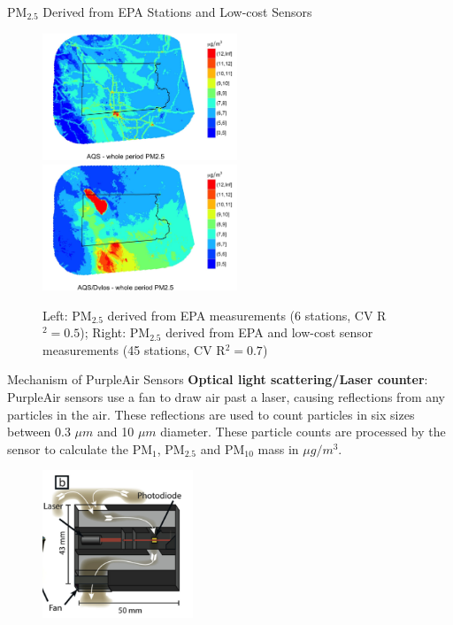 \documentclass[handout]{beamer} %
\begin{document}
\begin{frame}{PM$_{2.5}$ Derived from EPA Stations and Low-cost Sensors}
    \begin{figure}
        \centering
        \includegraphics[width=0.52\textwidth]{img/appendix/Aim2/aqs.jpg}
        \includegraphics[width=0.52\textwidth]{img/appendix/Aim2/aqs_dylos.jpg}
        \caption{Left: PM$_{2.5}$ derived from EPA measurements (6 stations, CV R$^2 = 0.5$); Right: PM$_{2.5}$ derived from EPA and low-cost sensor measurements (45 stations, CV R$^2 = 0.7$)}
    \end{figure}
\end{frame}

\begin{frame}{Mechanism of PurpleAir Sensors}
    \textbf{Optical light scattering/Laser counter}: PurpleAir sensors use a fan to draw air past a laser, causing reflections from any particles in the air. These reflections are used to count particles in six sizes between 0.3 $\mu m$ and 10 $\mu m$ diameter. These particle counts are processed by the sensor to calculate the PM$_1$, PM$_{2.5}$ and PM$_{10}$ mass in $\mu g/m^3$.
    \begin{figure}
        \centering
        \includegraphics[width=0.4\textwidth]{img/appendix/Aim2/sensor.png}
    \end{figure}
\end{frame}
\end{document}
